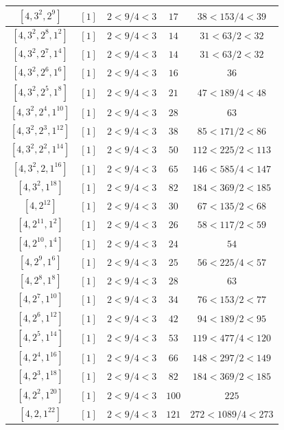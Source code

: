\documentclass{article}%
\begin{document}
\begin{center}
\begin{longtable}{||c|c|c|c|c||}
$[4, 3^{2}, 2^{9}]$ & $[1]$ & $2 < 9/4 < 3$ & $17$ & $38 < 153/4 < 39$ \\ \hline 
$[4, 3^{2}, 2^{8}, 1^{2}]$ & $[1]$ & $2 < 9/4 < 3$ & $14$ & $31 < 63/2 < 32$ \\ \hline 
$[4, 3^{2}, 2^{7}, 1^{4}]$ & $[1]$ & $2 < 9/4 < 3$ & $14$ & $31 < 63/2 < 32$ \\ \hline 
$[4, 3^{2}, 2^{6}, 1^{6}]$ & $[1]$ & $2 < 9/4 < 3$ & $16$ & $36$ \\ \hline 
$[4, 3^{2}, 2^{5}, 1^{8}]$ & $[1]$ & $2 < 9/4 < 3$ & $21$ & $47 < 189/4 < 48$ \\ \hline 
$[4, 3^{2}, 2^{4}, 1^{10}]$ & $[1]$ & $2 < 9/4 < 3$ & $28$ & $63$ \\ \hline 
$[4, 3^{2}, 2^{3}, 1^{12}]$ & $[1]$ & $2 < 9/4 < 3$ & $38$ & $85 < 171/2 < 86$ \\ \hline 
$[4, 3^{2}, 2^{2}, 1^{14}]$ & $[1]$ & $2 < 9/4 < 3$ & $50$ & $112 < 225/2 < 113$ \\ \hline 
$[4, 3^{2}, 2, 1^{16}]$ & $[1]$ & $2 < 9/4 < 3$ & $65$ & $146 < 585/4 < 147$ \\ \hline 
$[4, 3^{2}, 1^{18}]$ & $[1]$ & $2 < 9/4 < 3$ & $82$ & $184 < 369/2 < 185$ \\ \hline 
$[4, 2^{12}]$ & $[1]$ & $2 < 9/4 < 3$ & $30$ & $67 < 135/2 < 68$ \\ \hline 
$[4, 2^{11}, 1^{2}]$ & $[1]$ & $2 < 9/4 < 3$ & $26$ & $58 < 117/2 < 59$ \\ \hline 
$[4, 2^{10}, 1^{4}]$ & $[1]$ & $2 < 9/4 < 3$ & $24$ & $54$ \\ \hline 
$[4, 2^{9}, 1^{6}]$ & $[1]$ & $2 < 9/4 < 3$ & $25$ & $56 < 225/4 < 57$ \\ \hline 
$[4, 2^{8}, 1^{8}]$ & $[1]$ & $2 < 9/4 < 3$ & $28$ & $63$ \\ \hline 
$[4, 2^{7}, 1^{10}]$ & $[1]$ & $2 < 9/4 < 3$ & $34$ & $76 < 153/2 < 77$ \\ \hline 
$[4, 2^{6}, 1^{12}]$ & $[1]$ & $2 < 9/4 < 3$ & $42$ & $94 < 189/2 < 95$ \\ \hline 
$[4, 2^{5}, 1^{14}]$ & $[1]$ & $2 < 9/4 < 3$ & $53$ & $119 < 477/4 < 120$ \\ \hline 
$[4, 2^{4}, 1^{16}]$ & $[1]$ & $2 < 9/4 < 3$ & $66$ & $148 < 297/2 < 149$ \\ \hline 
$[4, 2^{3}, 1^{18}]$ & $[1]$ & $2 < 9/4 < 3$ & $82$ & $184 < 369/2 < 185$ \\ \hline 
$[4, 2^{2}, 1^{20}]$ & $[1]$ & $2 < 9/4 < 3$ & $100$ & $225$ \\ \hline 
$[4, 2, 1^{22}]$ & $[1]$ & $2 < 9/4 < 3$ & $121$ & $272 < 1089/4 < 273$ \\ \hline 

\end{longtable}
\end{center}
\end{document}
